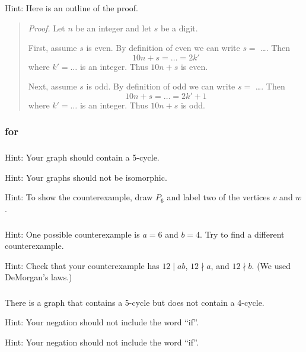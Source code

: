 \subsubsection*{ \answers}
 Hint: Here is an outline of the proof.
     \begin{quote}
        \emph{Proof.}  Let $n$ be an integer and let $s$ be a digit.  
        
        First, assume $s$ is even.  By definition of even we can write $s=$ \ldots.  Then $$10n+s = \ldots = 2k'$$
        where $k' = \ldots$ is an integer.  Thus $10n+s$ is even.

        Next, assume $s$ is odd.  By definition of odd we can write $s=$ \ldots.  Then $$10n+s = \ldots = 2k'+1$$
        where $k' = \ldots$ is an integer.  Thus $10n+s$ is odd.    
     \end{quote}

\subsubsection{\answers for  \subnegcond}

\subsubsection*{ \answers}
\begin{apart}
    \item Hint: Your graph should contain a 5-cycle.
    \item Hint: Your graphs should not be isomorphic.
    \item Hint: To show the counterexample, draw $P_6$ and label two of the vertices $v$ and $w$.
\end{apart}

\subsubsection*{ \answers}
\begin{apart}
    \item Hint: One possible counterexample is $a = 6$ and $b = 4$.  Try to find a different counterexample.
    \item Hint: Check that your counterexample has $12 \mid ab$, $12 \nmid a$, and $12 \nmid b$.  (We used DeMorgan's laws.)
\end{apart}

\subsubsection*{ \answers}
\begin{apart}
    \item There is a graph that contains a 5-cycle but does not contain a 4-cycle.
    \item Hint: Your negation should not include the word ``if''.
    \item Hint: Your negation should not include the word ``if''.
\end{apart}

